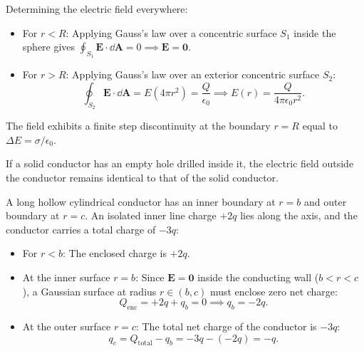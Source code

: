 \begin{example}
    Determining the electric field everywhere:
    \begin{itemize}
        \item For \(r < R\): Applying Gauss's law over a concentric surface \(S_1\) inside the sphere gives \(\oint_{S_1} \bm{E}\cdot\dd\bm{A} = 0 \implies \bm{E} = \bm{0}\).
        \item For \(r > R\): Applying Gauss's law over an exterior concentric surface \(S_2\):
        \begin{equation}
            \oint_{S_2} \bm{E}\cdot\dd\bm{A} = E(4\pi r^2) = \frac{Q}{\epsilon_0} \implies E(r) = \frac{Q}{4\pi\epsilon_0 r^2}.
        \end{equation}
    \end{itemize}
    The field exhibits a finite step discontinuity at the boundary \(r = R\) equal to \(\Delta E = \sigma / \epsilon_0\).
\end{example}

\begin{example}
    If a solid conductor has an empty hole drilled inside it, the electric field outside the conductor remains identical to that of the solid conductor.
\end{example}

\begin{example}
    A long hollow cylindrical conductor has an inner boundary at \(r = b\) and outer boundary at \(r = c\). An isolated inner line charge \(+2q\) lies along the axis, and the conductor carries a total charge of \(-3q\):
    \begin{itemize}
        \item For \(r < b\): The enclosed charge is \(+2q\).
        \item At the inner surface \(r = b\): Since \(\bm{E} = \bm{0}\) inside the conducting wall (\(b < r < c\)), a Gaussian surface at radius \(r \in (b, c)\) must enclose zero net charge:
        \begin{equation}
            Q_{\text{enc}} = +2q + q_b = 0 \implies q_b = -2q.
        \end{equation}
        \item At the outer surface \(r = c\): The total net charge of the conductor is \(-3q\):
        \begin{equation}
            q_c = Q_{\text{total}} - q_b = -3q - (-2q) = -q.
        \end{equation}
    \end{itemize}
\end{example}

